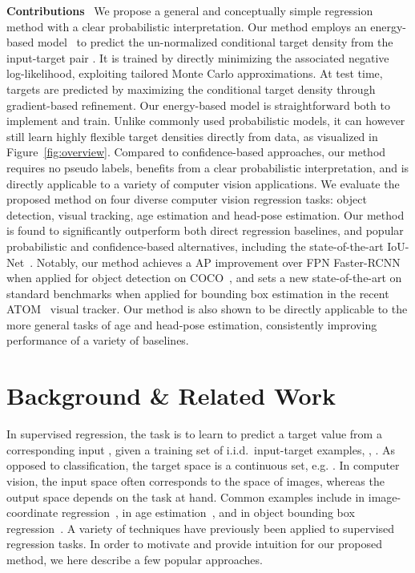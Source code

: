 \documentclass[runningheads]{llncs}
\newcommand{\parsection}[1]{\noindent\textbf{#1}~ }
\begin{document}
\parsection{Contributions} 
We propose a general and conceptually simple regression method with a clear probabilistic interpretation. Our method employs an energy-based model~\cite{lecun2006tutorial} to predict the un-normalized conditional target density  from the input-target pair . It is trained by directly minimizing the associated negative log-likelihood, exploiting tailored Monte Carlo approximations. At test time, targets are predicted by maximizing the conditional target density  through gradient-based refinement. Our energy-based model is straightforward both to implement and train. Unlike commonly used probabilistic models, it can however still learn highly flexible target densities directly from data, as visualized in Figure~\ref{fig:overview}. Compared to confidence-based approaches, our method requires no pseudo labels, benefits from a clear probabilistic interpretation, and is directly applicable to a variety of computer vision applications. We evaluate the proposed method on four diverse computer vision regression tasks: object detection, visual tracking, age estimation and head-pose estimation. Our method is found to significantly outperform both direct regression baselines, and popular probabilistic and confidence-based alternatives, including the state-of-the-art IoU-Net~\cite{jiang2018acquisition}. Notably, our method achieves a  AP improvement over FPN Faster-RCNN~\cite{lin2017feature} when applied for object detection on COCO~\cite{lin2014microsoft}, and sets a new state-of-the-art on standard benchmarks \cite{TrackingNet,UAV123} when applied for bounding box estimation in the recent ATOM~\cite{danelljan2019atom} visual tracker. Our method is also shown to be directly applicable to the more general tasks of age and head-pose estimation, consistently improving performance of a variety of baselines. \section{Background \& Related Work}
\label{section:related_work}

In supervised regression, the task is to learn to predict a target value  from a corresponding input , given a training set of i.i.d.\ input-target examples, , . As opposed to classification, the target space  is a continuous set, e.g. . In computer vision, the input space  often corresponds to the space of images, whereas the output space  depends on the task at hand. Common examples include  in image-coordinate regression~\cite{xiao2018simple,law2018cornernet},  in age estimation~\cite{rothe2016deep,pan2018mean}, and  in object bounding box regression~\cite{Ren2015FasterRT,jiang2018acquisition}. A variety of techniques have previously been applied to supervised regression tasks. In order to motivate and provide intuition for our proposed method, we here describe a few popular approaches.
\end{document}
